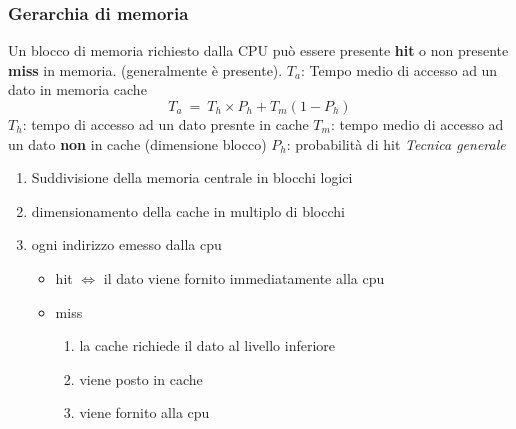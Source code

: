 \documentclass[12pt, a4paper]{article}
\theoremstyle{break}
\theoremstyle{lemma}
\theoremstyle{lemma}
\theoremstyle{lemma}
\begin{document}
\subsubsection{Gerarchia di memoria}
Un blocco di memoria richiesto dalla CPU può essere presente \textbf{hit} o non presente \textbf{miss} in memoria. (generalmente è presente). \newline
$T_a$: Tempo medio di accesso ad un dato in memoria cache 
\begin{equation} T_a\ =\ T_h \times P_h + T_m(1-P_h) \end{equation}
$T_h$: tempo di accesso ad un dato presnte in cache
$T_m$: tempo medio di accesso ad un dato \textbf{non} in cache (dimensione blocco)
$P_h$: probabilità di hit \newline
\textit{Tecnica generale} \newline
\begin{enumerate}
	\item Suddivisione della memoria centrale in blocchi logici
	\item dimensionamento della cache in multiplo di blocchi
	\item ogni indirizzo emesso dalla cpu
		\begin{itemize}
			\item hit $\iff$ il dato viene fornito immediatamente alla cpu
			\item miss
				\begin{enumerate}
					\item la cache richiede il dato al livello inferiore 
					\item viene posto in cache 
					\item viene fornito alla cpu 
				\end{enumerate}
		\end{itemize}
\end{enumerate}
\end{document}
